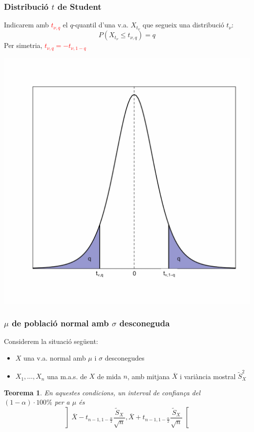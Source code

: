 \documentclass[12pt,t]{beamer}
\newcommand{\red}[1]{\textcolor{red}{#1}}
\renewcommand{\leq}{\leqslant}
\theoremstyle{plain}
\newtheorem{teorema}{Teorema}
\theoremstyle{definition}
\begin{document}
\begin{frame}
\frametitle{Distribució $t$ de Student}

Indicarem amb
\red{$t_{\nu,q}$} el  $q$-quantil d'una  v.a.  $X_{t_{\nu}}$ que segueix una distribució   $t_\nu$:
$$
P(X_{t_{\nu}}\leq t_{\nu,q})=q
$$
Per simetria,
\red{$t_{\nu,q}=-t_{\nu,1-q}$}
\vspace*{-1ex}

\begin{center}
\includegraphics[width=0.6\linewidth]{quantilt}
\end{center}
\end{frame}



\begin{frame}
\frametitle{$\mu$ de població normal amb $\sigma$ desconeguda}

Considerem  la situació següent:
\begin{itemize}
\item  $X$ una v.a.  normal amb $\mu$ i $\sigma$ desconegudes

\item $X_1,\ldots,X_n$ una m.a.s. de $X$  de mida $n$, amb mitjana $\overline{X}$ i variància mostral $\widetilde{S}_X^2$
\end{itemize}


\begin{teorema}
En aquestes condicions, un interval  de confiança del $(1-\alpha)\cdot 100\%$ per a $\mu$
és  
$$
\left] 
\overline{X}-t_{n-1,1-\frac{\alpha}{2}} \frac{\widetilde{S}_{X}}{\sqrt{n}},
\overline{X}+t_{n-1,1-\frac{\alpha}{2}}\frac{\widetilde{S}_{X}}{\sqrt{n}} \right[
$$
\end{teorema}

\end{frame}
\end{document}
